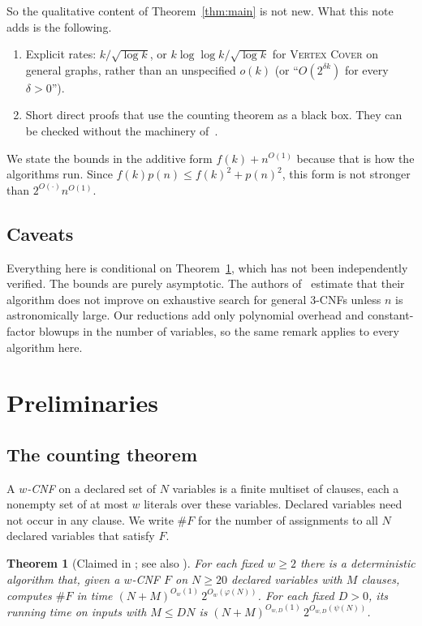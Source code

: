 \documentclass[11pt]{amsart}
\newtheorem{theorem}{Theorem}[section]
\theoremstyle{definition}
\theoremstyle{remark}
\newcommand{\VC}{\textup{\textsc{Vertex Cover}}}
\begin{document}
So the qualitative content of Theorem~\ref{thm:main} is not new. What this note adds is the following.
\begin{enumerate}[label=(\roman*)]
\item Explicit rates: $k/\sqrt{\log k}$, or $k\log\log k/\sqrt{\log k}$ for \VC{} on general graphs, rather than an unspecified $o(k)$ (or ``$O(2^{\delta k})$ for every $\delta>0$'').
\item Short direct proofs that use the counting theorem as a black box. They can be checked without the machinery of~\cite{CJ03}.
\end{enumerate}
We state the bounds in the additive form $f(k)+n^{O(1)}$ because that is how the algorithms run. Since $f(k)p(n)\le f(k)^2+p(n)^2$, this form is not stronger than $2^{O(\cdot)}n^{O(1)}$.

\subsection{Caveats}

Everything here is conditional on Theorem~\ref{thm:blackbox}, which has not been independently verified. The bounds are purely asymptotic. The authors of~\cite{Cla26} estimate that their algorithm does not improve on exhaustive search for general 3-CNFs unless $n$ is astronomically large. Our reductions add only polynomial overhead and constant-factor blowups in the number of variables, so the same remark applies to every algorithm here.

\section{Preliminaries}

\subsection{The counting theorem}

A \emph{$w$-CNF} on a declared set of $N$ variables is a finite multiset of clauses, each a nonempty set of at most $w$ literals over these variables. Declared variables need not occur in any clause. We write $\#F$ for the number of assignments to all $N$ declared variables that satisfy $F$.

\begin{theorem}[Claimed in {\cite[Theorem~1.1]{Ope26}}; see also {\cite[Theorem~1]{Cla26}}]\label{thm:blackbox}
For each fixed $w\ge 2$ there is a deterministic algorithm that, given a $w$-CNF $F$ on $N\ge 20$ declared variables with $M$ clauses, computes $\#F$ in time $(N+M)^{O_w(1)}\,2^{O_w(\varphi(N))}$. For each fixed $D>0$, its running time on inputs with $M\le DN$ is $(N+M)^{O_{w,D}(1)}\,2^{O_{w,D}(\psi(N))}$.
\end{theorem}
\end{document}

